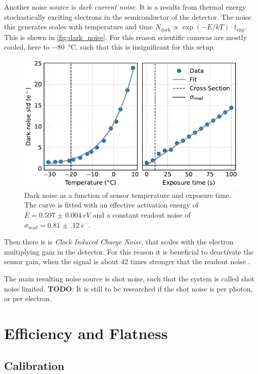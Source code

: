 \documentclass[
	parskip=half,
	a4paper,
]{scrarticle}
\begin{document}
Another noise source is \textit{dark current noise}. 
It is a results from thermal energy stochastically exciting electrons in the semiconductor of the detector. The noise this generates scales with temperature and time $N_\text{dark} \propto \exp(-E / k T) \cdot t_\text{exp}$. This is shown in \autoref{fig:dark_noise}.
For this reason scientific cameras are mostly cooled, here to \SI{-80}{\degreeCelsius}, such that this is insignificant for this setup.

\begin{figure}[hb]
    \centering
    \includegraphics{../analysis/figures/dark_noise.pdf}
    \caption{Dark noise as a function of sensor temperature and exposure time. The curve is fitted with an effective activation energy of $E = \SI{0.597(4)}{eV}$ and a constant readout noise of $\sigma_{\text{read}} = \SI{0.81(12)}{e^-}$.}
    \label{fig:dark_noise}
\end{figure}

Then there is is \textit{Clock Induced Charge Noise}, that scales with the electron multiplying gain in the detector. For this reason it is beneficial to deactivate the sensor gain, when the signal is about 42 times stronger that the readout noise \cite{andor_establishing_nodate}.

The main resulting noise source is shot noise, such that the system is called shot noise limited.
\textbf{TODO}: It is still to be researched if the shot noise is per photon, or per electron.

\clearpage
\section{Efficiency and Flatness}
\subsection{Calibration}
\end{document}

